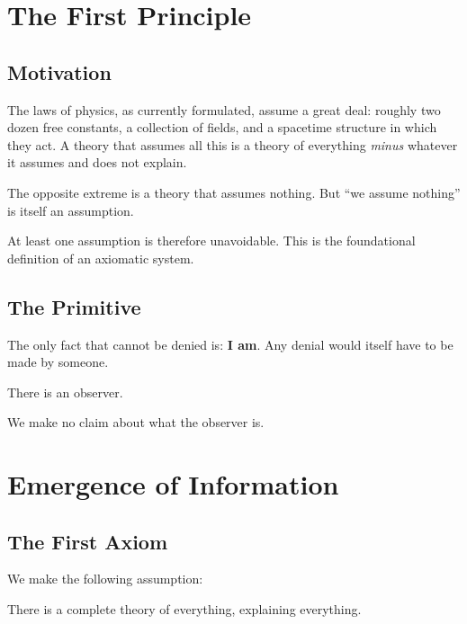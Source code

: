 \documentclass[11pt]{book}
\begin{document}



\tableofcontents

\mainmatter


\chapter{The First Principle}
\label{ch:first-principle}

\section{Motivation}

The laws of physics, as currently formulated, assume a great deal: roughly
two dozen free constants, a collection of fields, and a spacetime structure
in which they act. A theory that assumes all this is a theory of everything
\emph{minus} whatever it assumes and does not explain.

The opposite extreme is a theory that assumes nothing. But ``we assume
nothing'' is itself an assumption. 

At least one assumption is therefore unavoidable. This is the foundational
definition of an axiomatic system.


\section{The Primitive}

The only fact that cannot be denied is: \textbf{I am}.
Any denial would itself have to be made by someone.

\begin{primitive}[Observer]\label{pr:observer}
  There is an observer.
\end{primitive}

We make no claim about what the observer is.



\chapter{Emergence of Information}
\label{ch:information}

\section{The First Axiom}

We make the following assumption:

\begin{axiom}\label{ax:toe}
  There is a complete theory of everything, explaining everything.
\end{axiom}
\end{document}
